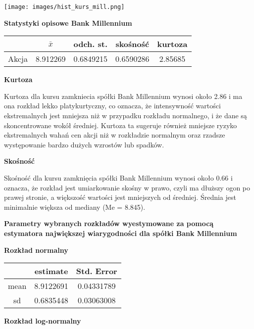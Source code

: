 \documentclass[12pt]{article}
\begin{document}
\begin{center}
\texttt{[image: images/hist\_kurs\_mill.png]}
\end{center}

\vspace{1.5 cm}
{\bf \large Statystyki opisowe Bank Millennium}
\vspace{0.5 cm}

\begin{table}[h]
\centering
\begin{tabular}{|c|c|c|c|c|}
\hline
 & \(\bar{x}\) & odch. st. & skośność & kurtoza \\
\hline
Akcja & 8.912269 & 0.6849215 & 0.6590286 & 2.85685\\
\hline
\end{tabular}
\end{table}
 
\vspace{1 cm}

{\bf Kurtoza}

Kurtoza dla kursu zamkniecia spółki Bank Millennium wynosi około 2.86 i ma ona rozkład lekko platykurtyczny, co oznacza, że intensywność wartości ekstremalnych jest mniejsza niż w przypadku rozkładu normalnego, i że dane są skoncentrowane wokół średniej. Kurtoza ta sugeruje również mniejsze ryzyko ekstremalnych wahań cen akcji niż w rozkładzie normalnym oraz rzadsze występowanie bardzo dużych wzrostów lub spadków.

{\bf Skośność}

Skośność dla kursu zamknięcia spółki Bank Millennium wynosi około 0.66 i oznacza, że rozkład jest umiarkowanie skośny w prawo, czyli ma dłuższy ogon po prawej stronie, a większość wartości jest mniejszych od średniej. Średnia jest minimalnie większa od mediany (Me = 8.845).

\vspace{2 cm}
{\large\bf{Parametry wybranych rozkładów wyestymowane za pomocą estymatora największej wiarygodności dla spółki Bank Millennium}}

\vspace{0.5 cm} 
{\bf Rozkład normalny}
\vspace{0.5 cm}

\begin{table}[h]
\centering
\begin{tabular}{|c|c|c|}
\hline
 & estimate & Std. Error \\
\hline
mean & 8.9122691 & 0.04331789 \\
\hline
sd & 0.6835448 & 0.03063008 \\
\hline
\end{tabular}
\end{table}
\vspace{0.5 cm}
{\bf Rozkład log-normalny}
\vspace{0.5 cm}
\end{document}

